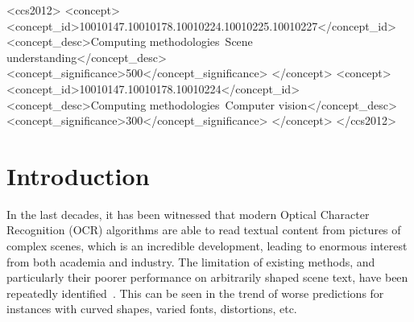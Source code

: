 \documentclass[sigconf]{acmart}
\begin{document}
\begin{CCSXML}
<ccs2012>
   <concept>
       <concept_id>10010147.10010178.10010224.10010225.10010227</concept_id>
       <concept_desc>Computing methodologies~Scene understanding</concept_desc>
       <concept_significance>500</concept_significance>
       </concept>
   <concept>
       <concept_id>10010147.10010178.10010224</concept_id>
       <concept_desc>Computing methodologies~Computer vision</concept_desc>
       <concept_significance>300</concept_significance>
       </concept>
 </ccs2012>
\end{CCSXML}





\maketitle



\section{Introduction}
In the last decades, it has been witnessed that modern Optical Character Recognition (OCR) algorithms are able to read textual content from pictures of complex scenes, which is an incredible development, leading to enormous interest from both academia and industry. The limitation of existing methods, and particularly their poorer performance on arbitrarily shaped scene text, have been repeatedly identified~\cite{liao2020masktext, liu2020abcnet, chng2019icdar2019}. This can be seen in the trend of worse predictions for instances with curved shapes, varied fonts, distortions, etc.
\end{document}
